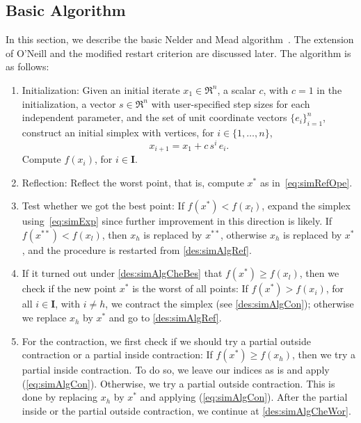 \subsection{Basic Algorithm}
In this section, we describe the basic Nelder and Mead algorithm~\cite{NelderMea1965}. 
The extension of O'Neill and the modified restart criterion are discussed later.
The algorithm is as follows:
\begin{enumerate}

\item Initialization: 
Given an initial iterate $x_1 \in \Re^n$,
a scalar $c$, with $c=1$ in the initialization,
a vector $s \in \Re^n$ with user-specified step sizes for each independent parameter,
and the set of unit coordinate vectors $\{ e_i \}_{i=1}^n$,
construct an initial simplex with vertices,
for $i \in \{1, \ldots , n \}$,
\begin{equation}
  x_{i+1} = x_1 + c \, s^i \, e_i.
\label{eq:simAlgIni}
\end{equation}
Compute $f(x_i)$, for $i \in \mathbf I$.
\item \label{des:simAlgRef} Reflection: 
Reflect the worst point, that is, compute $x^*$ as in~\eqref{eq:simRefOpe}.
\item \label{des:simAlgCheBes} Test whether we got the best point:
If $f(x^*) < f(x_l)$, expand the simplex using~\eqref{eq:simExp}
since further improvement in this direction is likely.
If $f(x^{**})< f(x_l)$, then 
$x_h$ is replaced by $x^{**}$,
otherwise $x_h$ is replaced by $x^*$, and 
the procedure is restarted from \ref{des:simAlgRef}.

\item 
If it turned out under \ref{des:simAlgCheBes} that $f(x^*) \ge f(x_l)$,
then we check if the new point $x^*$ is the worst of all points:
If $f(x^*) > f(x_i)$, for all $i \in \mathbf I$, with $i \ne h$, we contract 
the simplex (see \ref{des:simAlgCon}); 
otherwise we replace $x_h$ by $x^*$ and 
go to \ref{des:simAlgRef}.

\item \label{des:simAlgCon} 
For the contraction, we first check if we should try a partial outside 
contraction or a partial inside contraction: If $f(x^*) \ge f(x_h)$,
then we try a partial inside contraction.
To do so, we leave our indices as is and 
apply (\ref{eq:simAlgCon}). 
Otherwise, we try a partial outside contraction. 
This is done 
by replacing $x_h$ by $x^*$ and applying (\ref{eq:simAlgCon}). 
After the partial inside or the partial outside contraction,
we continue at \ref{des:simAlgCheWor}.


\end{enumerate}

